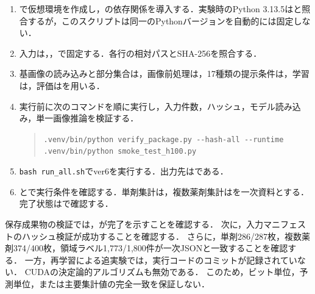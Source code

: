 \documentclass[uplatex,dvipdfmx]{jsarticle}
\begin{document}
\begin{sloppypar}
\raggedright
\begin{enumerate}
  \item {}で仮想環境を作成し，の依存関係を導入する．実験時のPython 3.13.5はと照合するが，このスクリプトは同一のPythonバージョンを自動的には固定しない．
  \item 入力は，，で固定する．各行の相対パスとSHA-256を照合する．
  \item 基画像の読み込みと部分集合は，画像前処理は，17種類の提示条件は，学習は，評価はを用いる．
  \item 実行前に次のコマンドを順に実行し，入力件数，ハッシュ，モデル読み込み，単一画像推論を検証する．
    \begin{quote}
      \verb|.venv/bin/python verify_package.py --hash-all --runtime|\\
      \verb|.venv/bin/python smoke_test_h100.py|
    \end{quote}
  \item \verb|bash run_all.sh|でver6を実行する．出力先はである．
  \item {}とで実行条件を確認する．単剤集計は，複数薬剤集計はを一次資料とする．完了状態はで確認する．
\end{enumerate}
\end{sloppypar}

保存成果物の検証では，が完了を示すことを確認する．
次に，入力マニフェストのハッシュ検証が成功することを確認する．
さらに，単剤286/287枚，複数薬剤374/400枚，領域ラベル1,773/1,800件が一次JSONと一致することを確認する．
一方，再学習による追実験では，実行コードのコミットが記録されていない．
CUDAの決定論的アルゴリズムも無効である．
このため，ビット単位，予測単位，または主要集計値の完全一致を保証しない．

\clearpage
{}

{\footnotesize
\raggedright


}
\end{document}

